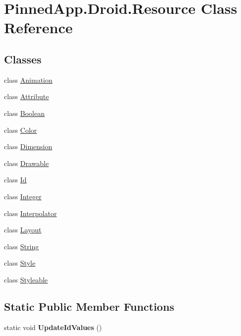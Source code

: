 \hypertarget{class_pinned_app_1_1_droid_1_1_resource}{}\section{Pinned\+App.\+Droid.\+Resource Class Reference}
\label{class_pinned_app_1_1_droid_1_1_resource}
\subsection*{Classes}
\begin{DoxyCompactItemize}
\item 
class \hyperlink{class_pinned_app_1_1_droid_1_1_resource_1_1_animation}{Animation}
\item 
class \hyperlink{class_pinned_app_1_1_droid_1_1_resource_1_1_attribute}{Attribute}
\item 
class \hyperlink{class_pinned_app_1_1_droid_1_1_resource_1_1_boolean}{Boolean}
\item 
class \hyperlink{class_pinned_app_1_1_droid_1_1_resource_1_1_color}{Color}
\item 
class \hyperlink{class_pinned_app_1_1_droid_1_1_resource_1_1_dimension}{Dimension}
\item 
class \hyperlink{class_pinned_app_1_1_droid_1_1_resource_1_1_drawable}{Drawable}
\item 
class \hyperlink{class_pinned_app_1_1_droid_1_1_resource_1_1_id}{Id}
\item 
class \hyperlink{class_pinned_app_1_1_droid_1_1_resource_1_1_integer}{Integer}
\item 
class \hyperlink{class_pinned_app_1_1_droid_1_1_resource_1_1_interpolator}{Interpolator}
\item 
class \hyperlink{class_pinned_app_1_1_droid_1_1_resource_1_1_layout}{Layout}
\item 
class \hyperlink{class_pinned_app_1_1_droid_1_1_resource_1_1_string}{String}
\item 
class \hyperlink{class_pinned_app_1_1_droid_1_1_resource_1_1_style}{Style}
\item 
class \hyperlink{class_pinned_app_1_1_droid_1_1_resource_1_1_styleable}{Styleable}
\end{DoxyCompactItemize}
\subsection*{Static Public Member Functions}
\begin{DoxyCompactItemize}
\item 
\mbox{\label{class_pinned_app_1_1_droid_1_1_resource_ae48c79e1c3c508063f21a3d182e35b91}} 
static void {\bfseries Update\+Id\+Values} ()
\end{DoxyCompactItemize}


